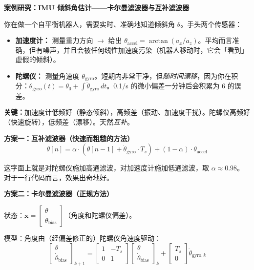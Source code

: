 \vspace{0.5em}
\begin{mdframed}[linewidth=1pt, innertopmargin=10pt, innerbottommargin=10pt]
\textbf{案例研究：IMU 倾斜角估计——卡尔曼滤波器与互补滤波器}

\vspace{0.3em}
你在做一个自平衡机器人，需要实时、准确地知道倾斜角 $\theta$。手头两个传感器：

\begin{itemize}[nosep]
    \item \textbf{加速度计：} 测量重力方向 $\to$ 给出 $\theta_{\text{accel}} = \arctan(a_x / a_z)$。平均而言准确，但有噪声，并且会被任何线性加速度污染（机器人移动时，它会「看到」虚假的倾斜）。
    \item \textbf{陀螺仪：} 测量角速度 $\dot{\theta}_{\text{gyro}}$。短期内非常干净，但\textit{随时间漂移}，因为你在积分：$\theta_{\text{gyro}}(t) = \theta_0 + \int \dot{\theta}_{\text{gyro}} \, dt$。0.1\textdegree/s 的微小偏差一分钟后会积累为 6\textdegree{} 的误差。
\end{itemize}

\textbf{关键：}加速度计低频好（静态倾斜），高频差（振动、加速度干扰）。陀螺仪高频好（快速旋转），低频差（漂移）。天然\textit{互补}。

\textbf{方案一：互补滤波器（快速而粗糙的方法）}
\[
\theta[n] = \alpha \cdot (\theta[n-1] + \dot{\theta}_{\text{gyro}} \cdot T_s) + (1 - \alpha) \cdot \theta_{\text{accel}}
\]

这字面上就是对陀螺仪施加高通滤波，对加速度计施加低通滤波，取 $\alpha \approx 0.98$。对于一行代码而言，效果出奇地好。

\textbf{方案二：卡尔曼滤波器（正规方法）}

状态：$\mathbf{x} = \begin{bmatrix} \theta \\ \dot{\theta}_{\text{bias}} \end{bmatrix}$（角度和陀螺仪偏差）。

模型：角度由（经偏差修正的）陀螺仪角速度驱动：
\[
\begin{bmatrix} \theta \\ \dot{\theta}_{\text{bias}} \end{bmatrix}_{k+1} =
\begin{bmatrix} 1 & -T_s \\ 0 & 1 \end{bmatrix}
\begin{bmatrix} \theta \\ \dot{\theta}_{\text{bias}} \end{bmatrix}_k +
\begin{bmatrix} T_s \\ 0 \end{bmatrix} \dot{\theta}_{\text{gyro},k}
\]


\end{mdframed}
